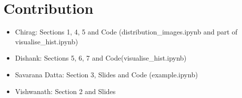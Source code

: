 \documentclass{article}
\begin{document}
\section{Contribution}
\begin{itemize}
    \item Chirag: Sections 1, 4, 5 and Code (distribution\_images.ipynb and part of visualise\_hist.ipynb)
    \item Dishank: Sections 5, 6, 7 and Code(visualise\_hist.ipynb)
    \item Savarana Datta: Section 3, Slides and Code (example.ipynb)
    \item Vishwanath: Section 2 and Slides
\end{itemize}
\end{document}
